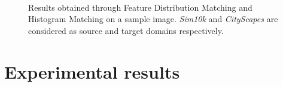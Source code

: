 \documentclass[%
    corpo=12pt,
    twoside,
    stile=classica,   
    tipotesi=magistrale,
    evenboxes,
    english
]{toptesi}
\begin{document}
\begin{figure}[ht!]
	\centering
	\\
	\caption{Results obtained through Feature Distribution Matching and Histogram Matching on a sample image. \textit{Sim10k} and \textit{CityScapes} are considered as source and target domains respectively.}
	\label{fig:kis}
\end{figure}



\chapter{Experimental results}
\end{document}
